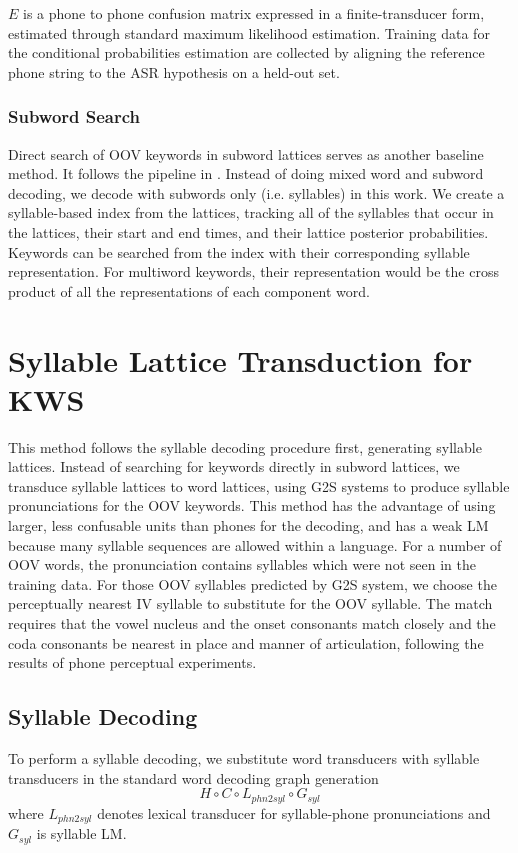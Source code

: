 \documentclass[journal]{IEEEtran}
\begin{document}
$E$ is a phone to phone confusion matrix expressed in a finite-transducer form, estimated through standard 
maximum likelihood estimation. Training data for the conditional probabilities estimation are collected by 
aligning the reference phone string to the ASR hypothesis on a held-out set.

\subsubsection{Subword Search}
Direct search of OOV keywords in subword lattices serves as another baseline method. It follows the 
pipeline in \cite{yanzhang2014subword}. Instead of doing mixed word and subword decoding, 
we decode with subwords only (i.e. syllables) in this work. We create a syllable-based index from the lattices, 
tracking all of the syllables that occur in the lattices, their start and end times, and their lattice 
posterior probabilities. Keywords can be searched from the index with their corresponding syllable representation. 
For multiword keywords, their representation would be the cross product of all the representations of each 
component word.

\section{Syllable Lattice Transduction for KWS}
This method follows the syllable decoding procedure first, generating syllable lattices. 
Instead of searching for keywords directly in subword lattices, we transduce syllable lattices 
to word lattices, using G2S systems to produce syllable pronunciations for the OOV keywords. This method 
has the advantage of using larger, less confusable units than phones for the decoding, and has a weak 
LM because many syllable sequences are allowed within a language. For a number of OOV words, the
pronunciation contains syllables which were not seen in the training data. For those OOV syllables 
predicted by G2S system, we choose the perceptually nearest IV syllable to substitute for the OOV syllable. 
The match requires that the vowel nucleus and the onset consonants match closely and the coda consonants 
be nearest in place and manner of articulation, following the results of phone perceptual 
experiments\cite{redford1999relative}.   

\subsection{Syllable Decoding}
\label{sec:syl_decode}
To perform a syllable decoding, we substitute word transducers with syllable transducers in the standard
word decoding graph generation
\begin{equation}
H \circ C \circ L_{phn2syl} \circ G_{syl}
\end{equation}
where $L_{phn2syl}$ denotes lexical transducer for syllable-phone pronunciations and $G_{syl}$ is syllable LM.
\end{document}
